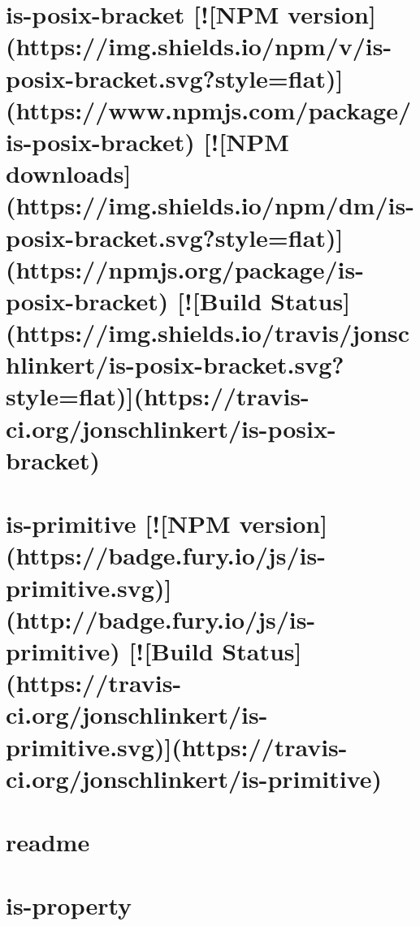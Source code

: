 \documentclass[twoside]{book}
\newcommand{\+}{\discretionary{\mbox{\scriptsize$\hookleftarrow$}}{}{}}
\begin{document}
\chapter{is-\/posix-\/bracket \mbox{[}!\mbox{[}N\+PM version\mbox{]}(https\+://img.shields.\+io/npm/v/is-\/posix-\/bracket.svg?style=flat)\mbox{]}(https\+://www.npmjs.\+com/package/is-\/posix-\/bracket) \mbox{[}!\mbox{[}N\+PM downloads\mbox{]}(https\+://img.shields.\+io/npm/dm/is-\/posix-\/bracket.svg?style=flat)\mbox{]}(https\+://npmjs.org/package/is-\/posix-\/bracket) \mbox{[}!\mbox{[}Build Status\mbox{]}(https\+://img.shields.\+io/travis/jonschlinkert/is-\/posix-\/bracket.svg?style=flat)\mbox{]}(https\+://travis-\/ci.org/jonschlinkert/is-\/posix-\/bracket)}
\label{md__c_1_workspace_demo_src_main_script_node_modules_is-posix-bracket__r_e_a_d_m_e}

\chapter{is-\/primitive \mbox{[}!\mbox{[}N\+PM version\mbox{]}(https\+://badge.fury.\+io/js/is-\/primitive.svg)\mbox{]}(http\+://badge.fury.\+io/js/is-\/primitive) \mbox{[}!\mbox{[}Build Status\mbox{]}(https\+://travis-\/ci.org/jonschlinkert/is-\/primitive.svg)\mbox{]}(https\+://travis-\/ci.org/jonschlinkert/is-\/primitive)}
\label{md__c_1_workspace_demo_src_main_script_node_modules_is-primitive__r_e_a_d_m_e}

\chapter{readme}
\label{md__c_1_workspace_demo_src_main_script_node_modules_is-promise_readme}

\chapter{is-\/property}
\label{md__c_1_workspace_demo_src_main_script_node_modules_is-property__r_e_a_d_m_e}

\end{document}
